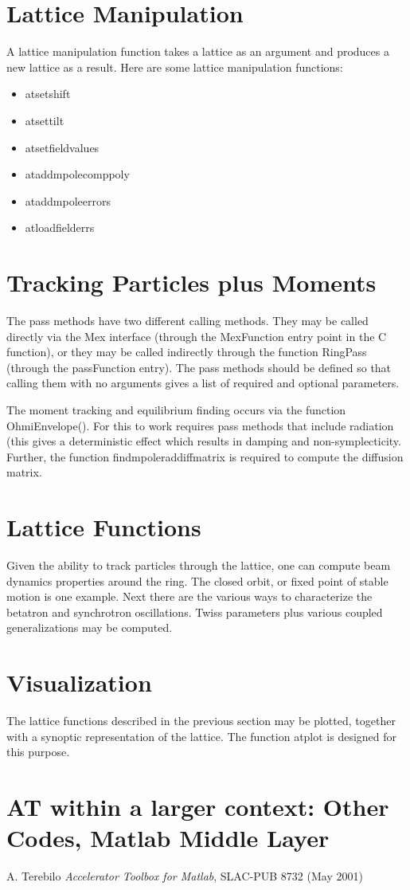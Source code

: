 \documentclass[acus]{article}
\begin{document}
\section{Lattice Manipulation}
A lattice manipulation function takes a lattice as an argument and produces a new lattice as a result.
Here are some lattice manipulation functions:
\begin{itemize}
\item atsetshift
\item atsettilt
\item atsetfieldvalues
\item ataddmpolecomppoly
\item ataddmpoleerrors
\item atloadfielderrs
\end{itemize}


\section{Tracking Particles plus Moments}
The pass methods have two different calling methods.  They may be called directly via the Mex interface (through the MexFunction entry point in the C function), or they may be called indirectly through the function RingPass (through the passFunction entry).  The pass methods should be defined so that calling them with no arguments gives a list of required and optional parameters.

The moment tracking and equilibrium finding occurs via the function OhmiEnvelope().  For this to work requires pass methods that include radiation (this gives a deterministic effect which results in damping and non-symplecticity.  Further, the function findmpoleraddiffmatrix is required to compute the diffusion matrix.

\section{Lattice Functions}
Given the ability to track particles through the lattice, one can compute beam dynamics properties around the ring.  The closed orbit, or fixed point of stable motion is one example.  Next there are the various ways to characterize the betatron and synchrotron oscillations.  Twiss parameters plus various coupled generalizations may be computed.

\section{Visualization}
The lattice functions described in the previous section may be plotted, together with a synoptic representation of the lattice.  The function atplot is designed for this purpose.

\section{AT within a larger context: Other Codes, Matlab Middle Layer}

\begin{thebibliography}{2}

A. Terebilo \emph{Accelerator Toolbox for Matlab}, SLAC-PUB 8732 (May 2001)

\end{thebibliography}
\end{document}
